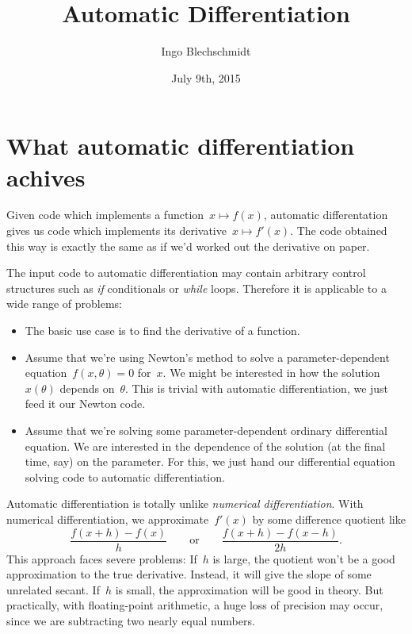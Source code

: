 \documentclass[a4paper,ngerman,12pt]{scrartcl}
\theoremstyle{definition}
\theoremstyle{plain}
\theoremstyle{remark}
\begin{document}
\title{Automatic Differentiation}
\author{Ingo Blechschmidt}
\date{July 9th, 2015}
\maketitle

\section{What automatic differentiation achives}

Given code which implements a function~$x \mapsto f(x)$, automatic
differentation gives us code which implements its derivative~$x \mapsto
f'(x)$. The code obtained this way is exactly the same as if we'd worked out
the derivative on paper.

The input code to automatic differentiation may contain arbitrary control
structures such as \emph{if} conditionals or \emph{while} loops. Therefore it
is applicable to a wide range of problems:

\begin{itemize}
\item The basic use case is to find the derivative of a function.
\item Assume that we're using Newton's method to solve a parameter-dependent
equation~$f(x,\theta) = 0$ for~$x$. We might be interested in how the
solution~$x(\theta)$ depends on~$\theta$. This is trivial with automatic
differentiation, we just feed it our Newton code.
\item Assume that we're solving some parameter-dependent ordinary differential
equation. We are interested in the dependence of the solution (at the final
time, say) on the parameter. For this, we just hand our differential equation
solving code to automatic differentiation.
\end{itemize}

Automatic differentiation is totally unlike \emph{numerical
differentiation}. With numerical differentiation, we approximate~$f'(x)$ by
some difference quotient like
\[ \frac{f(x + h) - f(x)}{h} \qquad\text{or}\qquad
  \frac{f(x + h) - f(x - h)}{2h}. \]
This approach faces severe problems: If~$h$ is large, the quotient won't be a
good approximation to the true derivative. Instead, it will give the slope of
some unrelated secant. If~$h$ is small, the approximation will be good in
theory. But practically, with floating-point arithmetic, a huge loss of
precision may occur, since we are subtracting two nearly equal numbers.
\end{document}
